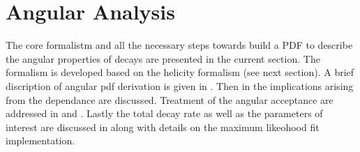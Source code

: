 

\section{Angular Analysis}
\label{Angular_Analysis}
 
The core formalistm and all the necessary steps towards build a PDF to describe the angular properties of \BJpsiKst decays are presented in
the current section. The formalism is developed based on the helicity formalism (see next section). A brief discription of 
angular pdf derivation is given in . Then in  the implications arising from the
\mkpi dependance are discussed. Treatment of the angular acceptance are addressed in  and .
Lastly the total decay rate as well as the \ACP parameters of interest are discussed in  along with details
on the maximum likeohood fit implementation.


